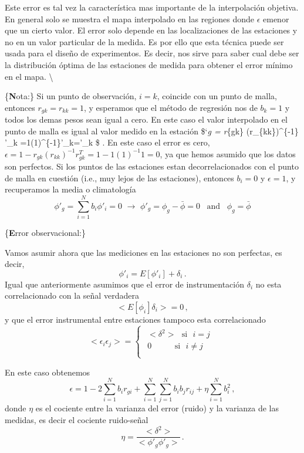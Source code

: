\documentclass[
]{agujournal2019}
\begin{document}
Este error es tal vez la característica mas importante de la
interpolación objetiva. En general solo se muestra el mapa interpolado
en las regiones donde \(\epsilon\) emenor que un cierto valor. El error
solo depende en las localizaciones de las estaciones y no en un valor
particular de la medida. Es por ello que esta técnica puede ser usada
para el diseño de experimentos. Es decir, nos sirve para saber cual debe
ser la distribución óptima de las estaciones de medida para obtener el
error mínimo en el mapa. \textbackslash{}

\{\textbf Nota:\} Si un punto de observación, \(i=k\), coincide con un
punto de malla, entonces \(r_{gk}=r_{kk}=1\), y esperamos que el método
de regresión nos de \(b_k=1\) y todos los demas pesos sean igual a cero.
En este caso el valor interpolado en el punto de malla es igual al valor
medido en la estación \$\phi`\emph{g = r}\{gk\} (r\_\{kk\})\^{}\{-1\}
\phi'\_k =1(1)\^{}\{-1\}\phi'\_k=\phi'\_k \$ . En este caso el error es
cero, \(\epsilon=1-r_{gk}(r_{kk})^{-1}r^T_{gk}=1-1(1)^{-1}1=0\), ya que
hemos asumido que los datos son perfectos. Si los puntos de las
estaciones estan decorrelacionados con el punto de malla en cuestión
(i.e., muy lejos de las estaciones), entonces \(b_i=0\) y
\(\epsilon=1\), y recuperamos la media o climatología
\[\phi'_g=\sum\limits^N_{i=1}b_i\phi'_i=0\,\,\rightarrow\,\,\phi'_g=\phi_g-\bar{\phi}=0\,\,\,\,\,\text{and}\,\,\,\,\,\phi_g=\bar{\phi}\]

\{\noindent \textbf Error observacional:\}

Vamos asumir ahora que las mediciones en las estaciones no son
perfectas, es decir, \[\phi'_i=E[\phi'_i] + \delta_i\,.\] Igual que
anteriormente asumimos que el error de instrumentación \(\delta_i\) no
esta correlacionado con la señal verdadera \[<E[\phi_i]\delta_i>=0\,,\]
y que el error instrumental entre estaciones tampoco esta correlacionado
\[<\epsilon_i \epsilon_j>=
\begin{cases}
\begin{array}{c}
   <\delta^2> \,\,\,\,\text{si}\,\,\,\,i=j\\
        0     \,\,\,\,\,\,\,\,\,\,\,\,\,\,\,\,\,\text{si}\,\,\,\,i\ne j\\
\end{array}
\end{cases}\]

En este caso obtenemos
\[\epsilon=1-2 \sum\limits^N_{i=1} b_i r_{gi} + \sum\limits^N_{i=1}\sum\limits^N_{j=1} b_i b_j r_{ij} + \eta\sum\limits_{i=1}^N b_i^2\,,\]
donde \(\eta\) es el cociente entre la varianza del error (ruido) y la
varianza de las medidas, es decir el cociente ruido-señal
\[\eta=\frac{<\delta^2>}{<\phi'_g\phi'_g>}\,.\]
\end{document}
